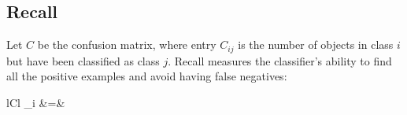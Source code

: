 \subsection{Recall}
Let $C$ be the confusion matrix, where entry $C_{ij}$ is the number of objects in class $i$
but have been classified as class $j$.
Recall measures the classifier's ability to find all the positive examples and avoid
having false negatives:
	\begin{IEEEeqnarray*}{lCl}
		_i &=& 
	\end{IEEEeqnarray*}


